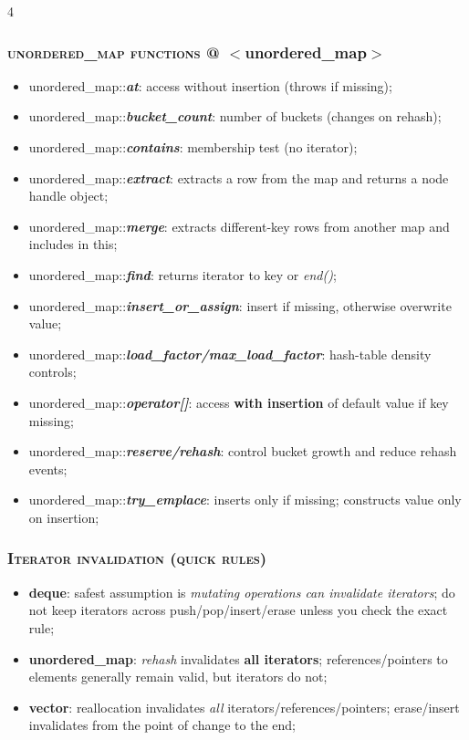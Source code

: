 \documentclass[10pt]{article}
\begin{document}
\begin{multicols*}{4}
{\subsubsection*{\textsc{unordered\_map functions} @ $<$unordered\_map$>$} 
\begin{itemize}[leftmargin=*,topsep=0.25pt]
  \setlength\itemsep{-1.8pt}
  \item unordered\_map::\emph{\textbf{at}}: access without insertion (throws if missing);
  \item unordered\_map::\emph{\textbf{bucket\_count}}: number of buckets (changes on rehash);
  \item unordered\_map::\emph{\textbf{contains}}: membership test (no iterator);
  \item unordered\_map::\emph{\textbf{extract}}: extracts a row from the map and returns a node handle object;
  \item unordered\_map::\emph{\textbf{merge}}: extracts different-key rows from another map and includes in this;
  \item unordered\_map::\emph{\textbf{find}}: returns iterator to key or \emph{end()};
  \item unordered\_map::\emph{\textbf{insert\_or\_assign}}: insert if missing, otherwise overwrite value;
  \item unordered\_map::\emph{\textbf{load\_factor/max\_load\_factor}}: hash-table density controls;
  \item unordered\_map::\emph{\textbf{operator[]}}: access \textbf{with insertion} of default value if key missing;
  \item unordered\_map::\emph{\textbf{reserve/rehash}}: control bucket growth and reduce rehash events;
  \item unordered\_map::\emph{\textbf{try\_emplace}}: inserts only if missing; constructs value only on insertion;
\end{itemize}

\subsubsection*{\textsc{Iterator invalidation (quick rules)}} 
\begin{itemize}[leftmargin=*,topsep=0.25pt]
  \setlength\itemsep{-1.8pt}
  \item \textbf{deque}: safest assumption is \emph{mutating operations can invalidate iterators}; do not keep iterators across push/pop/insert/erase unless you check the exact rule;
  \item \textbf{unordered\_map}: \emph{rehash} invalidates \textbf{all iterators}; references/pointers to elements generally remain valid, but iterators do not;
  \item \textbf{vector}: reallocation invalidates \emph{all} iterators/references/pointers; erase/insert invalidates from the point of change to the end;
\end{itemize}

}
\end{multicols*}
\end{document}
